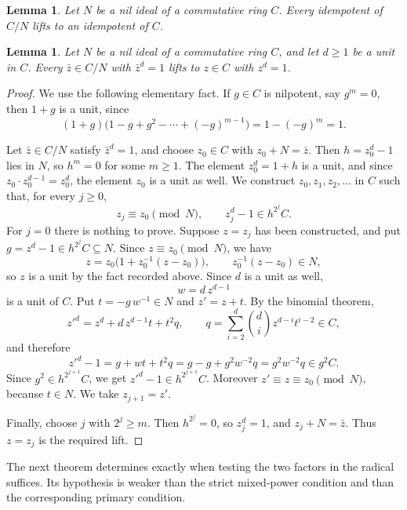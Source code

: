 \documentclass[11pt,a4paper]{amsart}
\newtheorem{lemma}[theorem]{Lemma}
\theoremstyle{definition}
\theoremstyle{remark}
\numberwithin{equation}{section}
\begin{document}
\begin{lemma}\label{lem:nil-lifts1} \cite[Theorem~21.28]{Lam2001}
Let $N$ be a nil ideal of a commutative ring $C$. Every idempotent of $C/N$ lifts
to an idempotent of $C$.
\end{lemma}

\begin{lemma}\label{lem:nil-lifts2}
Let $N$ be a nil ideal of a commutative ring $C$, and let $d\ge1$ be a unit in $C$.
Every $\bar z\in C/N$ with $\bar z^d=1$ lifts to $z\in C$ with $z^d=1$.
\end{lemma}

\begin{proof}
We use the following elementary fact. If $g\in C$ is nilpotent, say
$g^m=0$, then $1+g$ is a unit, since
\[
 (1+g)\bigl(1-g+g^2-\cdots+(-g)^{m-1}\bigr)=1-(-g)^m=1.
\]

Let $\bar z\in C/N$ satisfy $\bar z^d=1$, and choose $z_0\in C$ with
$z_0+N=\bar z$. Then $h=z_0^d-1$ lies in $N$, so $h^m=0$ for some
$m\ge1$. The element $z_0^d=1+h$ is a unit, and since
$z_0\cdot z_0^{d-1}=z_0^d$, the element $z_0$ is a unit as well. We construct
$z_0,z_1,z_2,\ldots$ in $C$ such that, for every $j\ge0$,
\[
 z_j\equiv z_0 \pmod N,\qquad z_j^d-1\in h^{2^j}C.
\]
For $j=0$ there is nothing to prove. Suppose $z=z_j$ has been
constructed, and put $g=z^d-1\in h^{2^j}C\subseteq N$. Since
$z\equiv z_0\pmod N$, we have
\[
 z=z_0\bigl(1+z_0^{-1}(z-z_0)\bigr),\qquad z_0^{-1}(z-z_0)\in N,
\]
so $z$ is a unit by the fact recorded above. Since $d$ is a unit as well,
\[
 w=d\,z^{d-1}
\]
is a unit of $C$. Put $t=-g\,w^{-1}\in N$ and $z'=z+t$. By the binomial
theorem,
\[
 z'^d=z^d+d\,z^{d-1}t+t^2q,\qquad
 q=\sum_{i=2}^{d}\binom di z^{d-i}t^{i-2}\in C,
\]
and therefore
\[
 z'^d-1=g+wt+t^2q=g-g+g^2w^{-2}q=g^2w^{-2}q\in g^2C.
\]
Since $g^2\in h^{2^{j+1}}C$, we get $z'^d-1\in h^{2^{j+1}}C$. Moreover
$z'\equiv z\equiv z_0\pmod N$, because $t\in N$. We take $z_{j+1}=z'$.

Finally, choose $j$ with $2^j\ge m$. Then $h^{2^j}=0$, so $z_j^d=1$, and
$z_j+N=\bar z$. Thus $z=z_j$ is the required lift.
\end{proof}




The next theorem determines exactly when testing the two factors in the
radical suffices. Its hypothesis is weaker than the strict mixed-power
condition and than the corresponding primary condition.
\end{document}
